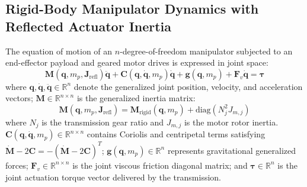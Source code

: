 \documentclass[journal,10pt,twocolumn]{IEEEtran}
\begin{document}
\subsection{Rigid-Body Manipulator Dynamics with Reflected Actuator Inertia}
The equation of motion of an $n$-degree-of-freedom manipulator subjected to an end-effector payload and geared motor drives is expressed in joint space:
\begin{equation}
    \bm{M}(\bm{q}, m_p, \bm{J}_{\text{refl}})\ddot{\bm{q}} + \bm{C}(\bm{q}, \dot{\bm{q}}, m_p)\dot{\bm{q}} + \bm{g}(\bm{q}, m_p) + \bm{F}_v \dot{\bm{q}} = \bm{\tau}
    \label{eq:manipulator_dynamics}
\end{equation}
where $\bm{q}, \dot{\bm{q}}, \ddot{\bm{q}} \in \mathbb{R}^n$ denote the generalized joint position, velocity, and acceleration vectors; $\bm{M} \in \mathbb{R}^{n \times n}$ is the generalized inertia matrix:
\begin{equation}
    \bm{M}(\bm{q}, m_p, \bm{J}_{\text{refl}}) = \bm{M}_{\text{rigid}}(\bm{q}, m_p) + \text{diag}\left(N_j^2 J_{m,j}\right)
\end{equation}
where $N_j$ is the transmission gear ratio and $J_{m,j}$ is the motor rotor inertia. $\bm{C}(\bm{q}, \dot{\bm{q}}, m_p) \in \mathbb{R}^{n \times n}$ contains Coriolis and centripetal terms satisfying $\dot{\bm{M}} - 2\bm{C} = -(\dot{\bm{M}} - 2\bm{C})^T$; $\bm{g}(\bm{q}, m_p) \in \mathbb{R}^n$ represents gravitational generalized forces; $\bm{F}_v \in \mathbb{R}^{n \times n}$ is the joint viscous friction diagonal matrix; and $\bm{\tau} \in \mathbb{R}^n$ is the joint actuation torque vector delivered by the transmission.
\end{document}
